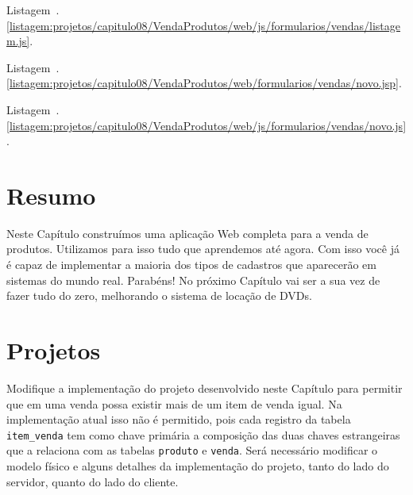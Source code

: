 Listagem~\thechapter.\ref{listagem:projetos/capitulo08/VendaProdutos/web/js/formularios/vendas/listagem.js}.



Listagem~\thechapter.\ref{listagem:projetos/capitulo08/VendaProdutos/web/formularios/vendas/novo.jsp}.



Listagem~\thechapter.\ref{listagem:projetos/capitulo08/VendaProdutos/web/js/formularios/vendas/novo.js}.



\section{Resumo}

Neste Capítulo construímos uma aplicação Web completa para a venda de produtos. Utilizamos para isso tudo que aprendemos até agora. Com isso você já é capaz de implementar a maioria dos tipos de cadastros que aparecerão em sistemas do mundo real. Parabéns! No próximo Capítulo vai ser a sua vez de fazer tudo do zero, melhorando o sistema de locação de DVDs. 


\section{Projetos}

\begin{projetoSemArquivo}{}{}{}
    Modifique a implementação do projeto desenvolvido neste Capítulo para permitir que em uma venda possa existir mais de um item de venda igual. Na implementação atual isso não é permitido, pois cada registro da tabela \texttt{item\_venda} tem como chave primária a composição das duas chaves estrangeiras que a relaciona com as tabelas \texttt{produto} e \texttt{venda}. Será necessário modificar o modelo físico e alguns detalhes da implementação do projeto, tanto do lado do servidor, quanto do lado do cliente.
\end{projetoSemArquivo}
